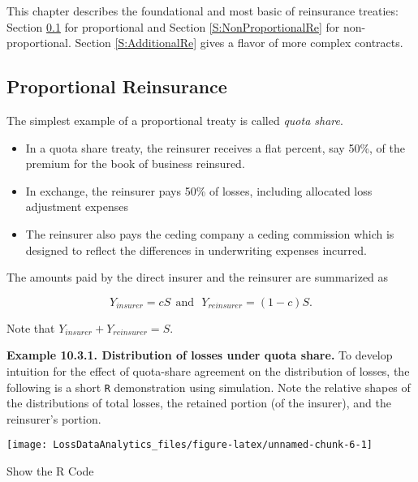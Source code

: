 \documentclass[]{book}
\theoremstyle{definition}
\theoremstyle{definition}
\theoremstyle{definition}
\theoremstyle{remark}
\begin{document}
This chapter describes the foundational and most basic of reinsurance
treaties: Section \ref{S:ProportionalRe} for proportional and Section
\ref{S:NonProportionalRe} for non-proportional. Section
\ref{S:AdditionalRe} gives a flavor of more complex contracts.

\subsection{Proportional Reinsurance}\label{S:ProportionalRe}

The simplest example of a proportional treaty is called \emph{quota
share}.

\begin{itemize}
\item
  In a quota share treaty, the reinsurer receives a flat percent, say
  50\%, of the premium for the book of business reinsured.
\item
  In exchange, the reinsurer pays 50\% of losses, including allocated
  loss adjustment expenses
\item
  The reinsurer also pays the ceding company a ceding commission which
  is designed to reflect the differences in underwriting expenses
  incurred.
\end{itemize}

The amounts paid by the direct insurer and the reinsurer are summarized
as

\[
Y_{insurer} = c S \ \ \text{and} \ \ \ Y_{reinsurer} = (1-c) S.
\]

Note that \(Y_{insurer}+Y_{reinsurer}=S\).

\textbf{Example 10.3.1. Distribution of losses under quota share.} To
develop intuition for the effect of quota-share agreement on the
distribution of losses, the following is a short \texttt{R}
demonstration using simulation. Note the relative shapes of the
distributions of total losses, the retained portion (of the insurer),
and the reinsurer's portion.

\begin{center}\texttt{[image: LossDataAnalytics\_files/figure-latex/unnamed-chunk-6-1]} \end{center}

Show the R Code
\end{document}

